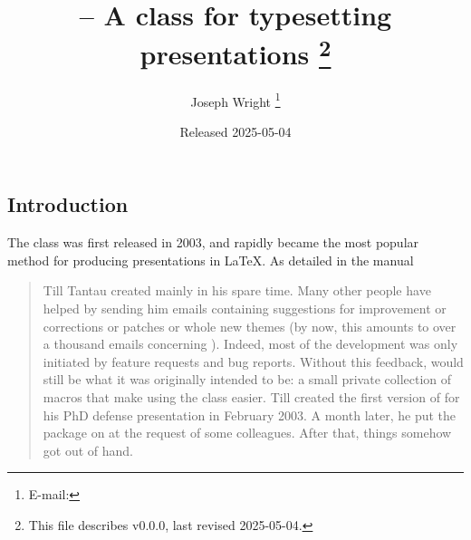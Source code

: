 \documentclass{l3doc}
\makeatletter
\let\acro\@firstofone
\def\filedate{2025-05-04}
\def\fileversion{v0.0.0}
\makeatother
\begin{document}
\title{%
   -- A class for typesetting presentations%
  \thanks{This file describes \fileversion,
    last revised \filedate.}%
}

\author{%
  Joseph Wright%
  \thanks{%
    E-mail: %
  }%
}

\date{Released \filedate}

\maketitle

\tableofcontents

\begin{documentation}

\section{Introduction%
  \label{sec:intro}}

The  class was first released in 2003, and rapidly became the
most popular method for producing presentations in \LaTeX{}. As detailed in
the  manual
\begin{quotation}
  Till Tantau created  mainly in his spare time. Many other people
  have helped by sending him emails containing suggestions for improvement or
  corrections or patches or whole new themes (by now, this amounts to over a
  thousand emails concerning ). Indeed, most of the development was
  only initiated by feature requests and bug reports. Without this feedback,
   would still be what it was originally intended to be: a small
  private collection of macros that make using the  class easier.
  Till created the first version of  for his PhD defense
  presentation in February 2003. A month later, he put the package on
  \acro{ctan} at the request of some colleagues. After that, things somehow got
  out of hand.
\end{quotation}


\end{documentation}
\end{document}
